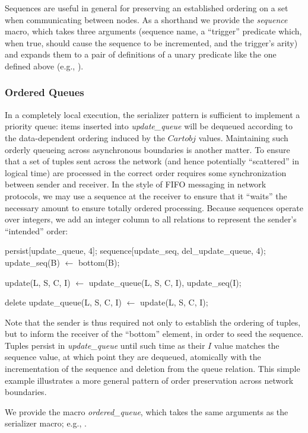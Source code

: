 Sequences are useful in general for preserving an established ordering on a set
when communicating between nodes.  As a shorthand we provide the {\em sequence}
macro, which takes three arguments (sequence name, a ``trigger'' predicate
which, when true, should cause the sequence to be incremented, and the
trigger's arity) and expands them to a pair of definitions of a unary predicate
like the one defined above (e.g., ).


\subsubsection{Ordered Queues}
In a completely local execution, the serializer pattern is sufficient to implement a
priority queue:  items inserted into {\em update\_queue} will be dequeued 
according to the data-dependent ordering induced by the $Cartobj$ values.
Maintaining such orderly queueing across asynchronous boundaries is another
matter.  To ensure that a set of tuples sent across the network (and hence potentially 
``scattered'' in logical time) are processed in the correct order requires some synchronization
between sender and receiver.  In the style of FIFO messaging in network protocols, 
we may use a sequence at the receiver to ensure that it ``waits'' 
the necessary amount to ensure totally ordered processing.  Because
sequences operate over integers, we add an integer column to all relations to represent 
the sender's ``intended'' order:

\begin{Dedalus}
persist[update_queue, 4];
sequence[update_seq, del_update_queue, 4);
update_seq(B) \(\leftarrow\) bottom(B);

update(L, S, C, I) \(\leftarrow\)
  update_queue(L, S, C, I),
  update_seq(I);

delete update_queue(L, S, C, I) \(\leftarrow\)
  update(L, S, C, I);
\end{Dedalus}

Note that the sender is thus required not only to establish the ordering of tuples, but
to inform the receiver of the ``bottom'' element, in order to seed the sequence.
Tuples persist in {\em update\_queue} until such time as their $I$ value matches the 
sequence value, at which point they are dequeued, atomically with the incrementation
of the sequence and deletion from the queue relation.  This simple example illustrates
a more general pattern of order preservation across network boundaries.

We provide the macro {\em ordered\_queue}, which takes the same arguments as the serializer macro; e.g., .

